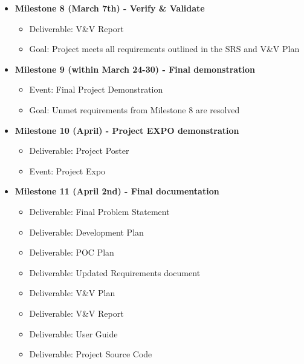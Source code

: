 \documentclass{scrreprt}
\theoremstyle{definition}
\begin{document}
\begin{itemize}
    \item \textbf{Milestone 8 (March 7th) - Verify \& Validate}
    \begin{itemize}
        \item Deliverable: V\&V Report
        \item Goal: Project meets all requirements outlined in the SRS and V\&V Plan
    \end{itemize}

    \item \textbf{Milestone 9 (within March 24-30) - Final demonstration}
    \begin{itemize}
    	\item Event: Final Project Demonstration
    	\item Goal: Unmet requirements from Milestone 8 are resolved
    \end{itemize}

    \item \textbf{Milestone 10 (April) - Project EXPO demonstration}
    \begin{itemize}
        \item Deliverable: Project Poster
        \item Event: Project Expo
    \end{itemize}

    \item \textbf{Milestone 11 (April 2nd) - Final documentation}
    \begin{itemize}
        \item Deliverable: Final Problem Statement
        \item Deliverable: Development Plan
        \item Deliverable: POC Plan
        \item Deliverable: Updated Requirements document
        \item Deliverable: V\&V Plan
        \item Deliverable: V\&V Report
        \item Deliverable: User Guide
        \item Deliverable: Project Source Code
    \end{itemize}
\end{itemize}
\end{document}

